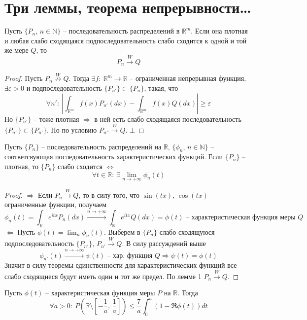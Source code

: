 \section{Три леммы, теорема непрерывности\dots}
\begin{lemma}
	Пусть $\{P_n,\, n \in \mathbb{N}\}$ -- последовательность распределений в $\mathbb{R}^m$. Если она плотная и любая слабо сходящаяся подпоследовательность слабо сходится к одной и той же мере $Q$, то
	\[P_n \stackrel{W}{\to} Q\]
\end{lemma}

\begin{proof}
	Пусть $P_n \stackrel{W}{\not\to} Q$. Тогда $\exists f:\: \mathbb{R}^m \to \mathbb{R}$ -- ограниченная непрерывная функция, $\exists \varepsilon > 0$ и подпоследовательность $\{P_{n'}\} \subset \{P_n\}$, такая, что
	\[\forall n' :\: \left|\int_{\mathbb{R}^m}f(x)P_{n'}(dx) - \int_{\mathbb{R}^m}f(x)Q(dx)\right| \geq \varepsilon\]
	Но $\{P_{n'}\}$ -- тоже плотная $\Rightarrow$ в ней есть слабо сходящаяся последовательность $\{P_{n''}\} \subset \{P_{n'}\}$. Но по условию $P_{n''} \stackrel{W}{\to} Q$. $\bot$
\end{proof}

\begin{lemma}
	Пусть $\{P_n\}$ -- последовательность распределений на $\mathbb{R},\, \{\phi_n,\, n \in \mathbb{N}\}$ -- соответсвующая последовательность характеристических функций. Если $\{P_n\}$ -- плотная, то $\{P_n\}$ слабо сходится $\Leftrightarrow$
	\[\forall t \in \mathbb{R} :\: \exists\lim_{n \to +\infty}\phi_n(t)\]
\end{lemma}

\begin{proof}
	$\Rightarrow$ Если $P_n \stackrel{W}{\to} Q$, то в силу того, что $\sin(tx),\,\cos(tx)$ -- ограниченные функции, получаем
	\[\phi_n(t) = \int_\mathbb{R}e^{itx}P_n(dx) \stackrel{n \to +\infty}{\to} \int_\mathbb{R}e^{itx}Q(dx) = \phi(t) \text{ -- характеристическая функция меры }Q\]
	$\Leftarrow$ Пусть $\phi(t) = \lim_n \phi_n(t)$. Выберем в $\{P_n\}$ слабо сходящуюся подпоследовательность $\{P_{n'}\},\, P_{n'} \stackrel{W}{\to} Q$. В силу рассуждений выше
	\[\phi_{n'}(t) \stackrel{n \to +\infty}{\to} \psi(t) \text{ -- хар. функция }Q \Rightarrow \psi(t) = \phi(t)\]
	Значит в силу теоремы единственности для характеристических функций все слабо сходящиеся будут иметь один и тот же предел. По лемме 1 $P_n \stackrel{W}{\to} Q$.
\end{proof}

\begin{lemma}
	Пусть $\phi(t)$ -- характеристическая функция меры $P$ на $\mathbb{R}$. Тогда
	\[\forall a > 0 :\: P\left(\mathbb{R} \setminus \left[-\frac{1}{a},\, \frac{1}{a}\right]\right) \leq \frac{7}{a} \int_0^a (1 - \Re\phi(t))dt\]
\end{lemma}

